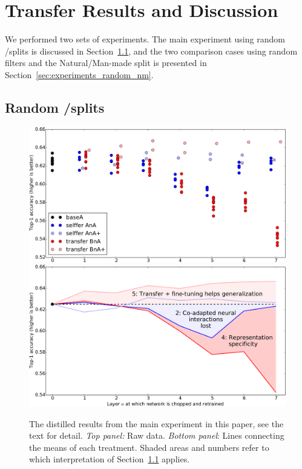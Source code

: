 \section{Transfer Results and Discussion}
\label{sec:experiments}

We performed two sets of experiments. The main experiment using random \dA/\dB splits is discussed in Section~\ref{sec:experiments_ab}, and the two comparison cases using random filters and the Natural/Man-made split is presented in Section~\ref{sec:experiments_random_nm}.




\subsection{Random \dA/\dB splits}
\label{sec:experiments_ab}


\begin{figure}[t]
\begin{center}
\includegraphics[width=.9\linewidth]{plots/result_transfer_crop.pdf}
\includegraphics[width=.9\linewidth]{plots/result_transfer_lines_crop.pdf}
\end{center}
\caption{The distilled results from the main experiment in this paper, see the text for detail. \emph{Top panel:} Raw data. \emph{Bottom panel}: Lines connecting the means of each treatment. Shaded areas and numbers refer to which interpretation of Section~\ref{sec:experiments_ab} applies.
}
\label{fig:results}
\end{figure}

